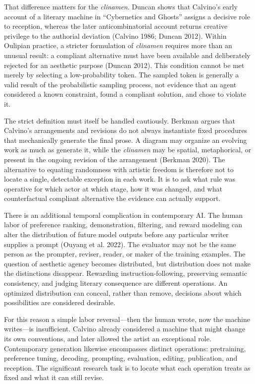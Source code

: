 \documentclass[
  11pt,
  letterpaper,
]{article}
\begin{document}
That difference matters for the \emph{clinamen}. Duncan shows that
Calvino's early account of a literary machine in ``Cybernetics and
Ghosts'' assigns a decisive role to reception, whereas the later
anticombinatorial account returns creative privilege to the authorial
deviation (Calvino 1986; Duncan 2012). Within Oulipian practice, a
stricter formulation of \emph{clinamen} requires more than an unusual
result: a compliant alternative must have been available and
deliberately rejected for an aesthetic purpose (Duncan 2012). This
condition cannot be met merely by selecting a low-probability token. The
sampled token is generally a valid result of the probabilistic sampling
process, not evidence that an agent considered a known constraint, found
a compliant solution, and chose to violate it.

The strict definition must itself be handled cautiously. Berkman argues
that Calvino's arrangements and revisions do not always instantiate
fixed procedures that mechanically generate the final prose. A diagram
may organize an evolving work as much as generate it, while the
\emph{clinamen} may be spatial, metaphorical, or present in the ongoing
revision of the arrangement (Berkman 2020). The alternative to equating
randomness with artistic freedom is therefore not to locate a single,
detectable exception in each work. It is to ask what rule was operative
for which actor at which stage, how it was changed, and what
counterfactual compliant alternative the evidence can actually support.

There is an additional temporal complication in contemporary AI. The
human labor of preference ranking, demonstration, filtering, and reward
modeling can alter the distribution of future model outputs before any
particular writer supplies a prompt (Ouyang et al. 2022). The evaluator
may not be the same person as the prompter, reviser, reader, or maker of
the training examples. The question of aesthetic agency becomes
distributed, but distribution does not make the distinctions disappear.
Rewarding instruction-following, preserving semantic consistency, and
judging literary consequence are different operations. An optimized
distribution can conceal, rather than remove, decisions about which
possibilities are considered desirable.

For this reason a simple labor reversal---then the human wrote, now the
machine writes---is insufficient. Calvino already considered a machine
that might change its own conventions, and later allowed the artist an
exceptional role. Contemporary generation likewise encompasses distinct
operations: pretraining, preference tuning, decoding, prompting,
evaluation, editing, publication, and reception. The significant
research task is to locate what each operation treats as fixed and what
it can still revise.
\end{document}
